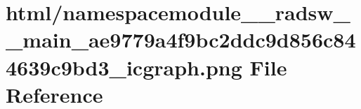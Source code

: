 \hypertarget{namespacemodule____radsw____main__ae9779a4f9bc2ddc9d856c844639c9bd3__icgraph_8png}{}\section{html/namespacemodule\+\_\+\+\_\+radsw\+\_\+\+\_\+main\+\_\+ae9779a4f9bc2ddc9d856c844639c9bd3\+\_\+icgraph.png File Reference}
\label{namespacemodule____radsw____main__ae9779a4f9bc2ddc9d856c844639c9bd3__icgraph_8png}
